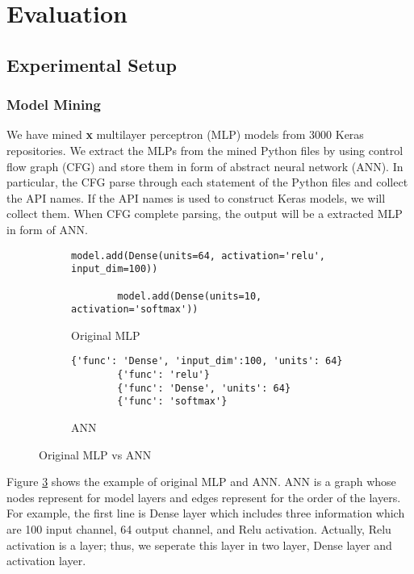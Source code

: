 \section{Evaluation}
\label{sec:evaluation}
\subsection{Experimental Setup}
\subsubsection{\textbf{Model Mining}}We have mined {\bf x} multilayer perceptron (MLP) models from 3000 Keras repositories. We extract the MLPs from the mined Python files by using control flow graph (CFG) and store them in form of abstract neural network (ANN). In particular, the CFG parse through each statement of the Python files and collect the API names. If the API names is used to construct Keras models, we will collect them. When CFG complete parsing, the output will be a extracted MLP in form of ANN.
\begin{figure}[H]
	\centering
	\begin{subfigure}[b]{.45\linewidth}
		\begin{lstlisting}[basicstyle=\tiny,numberblanklines=false]
		model.add(Dense(units=64, activation='relu', input_dim=100)) 
		
		model.add(Dense(units=10, activation='softmax'))
		\end{lstlisting}
		\caption{Original MLP}
		\label{fig:originalCNN}
	\end{subfigure}
	\begin{subfigure}[b]{.45\linewidth}
		\begin{lstlisting}[basicstyle=\tiny,numberblanklines=false]	
		{'func': 'Dense', 'input_dim':100, 'units': 64} 
		{'func': 'relu'}
		{'func': 'Dense', 'units': 64}
		{'func': 'softmax'}
		\end{lstlisting}
		\caption{ANN}
		\label{fig:convertedCNN}
	\end{subfigure}
	\caption{Original MLP vs ANN}
	\label{fig:converted}
\end{figure}
Figure \ref{fig:converted} shows the example of original MLP and ANN. ANN is a graph whose nodes represent for model layers and edges represent for the order of the layers. For example, the first line is Dense layer which includes three information which are 100 input channel, 64 output channel, and Relu activation. Actually, Relu activation is a layer; thus, we seperate this layer in two layer, Dense layer and activation layer.
